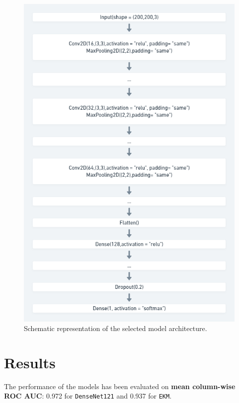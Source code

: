 \documentclass[aps,twocolumn,secnumarabic,nobalancelastpage,amsmath,amssymb,
nofootinbib]{revtex4}
\begin{document}
\begin{figure}
	\centering
	\includegraphics[width=0.7\linewidth]{Images/BaseNetShort}
	\caption{Schematic representation of the selected model architecture.}\label{fig:basenet}
\end{figure}

\section{Results}\label{results}

The performance of the models has been evaluated on \textbf{mean
column-wise ROC AUC}: 0.972 for \texttt{DenseNet121} and 0.937 for
\texttt{EKM}.
\end{document}
